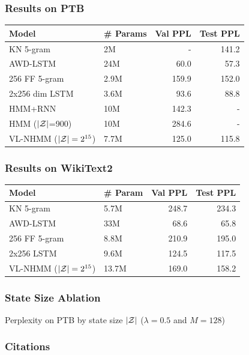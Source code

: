 \documentclass{beamer}
\begin{document}
\begin{frame}
\frametitle{Results on PTB}

\begin{table}[!t]
\centering
\begin{tabular}{llrr}
\toprule
Model & \# Params & Val PPL  & Test PPL\\
\midrule
KN 5-gram   & 2M & - & 141.2\\
AWD-LSTM  & 24M & 60.0 & 57.3\\
256 FF 5-gram  & 2.9M     & 159.9      & 152.0  \\
2x256 dim LSTM  & 3.6M     & 93.6       & 88.8   \\
HMM+RNN   & 10M & 142.3 & -\\
HMM ($|\mathcal{Z}|$=900) & 10M & 284.6 & -\\
VL-NHMM ($|\mathcal{Z}|=2^{15}$)   & 7.7M     & 125.0      & 115.8  \\
\bottomrule
\end{tabular}
\end{table}

\end{frame}

\begin{frame}
\frametitle{Results on WikiText2}

\begin{table}[!t]
\centering
\begin{tabular}{llrr}
\toprule
Model & \# Param & Val PPL & Test PPL\\
\midrule
KN 5-gram & 5.7M       & 248.7 & 234.3\\
AWD-LSTM & 33M & 68.6 & 65.8\\
256 FF 5-gram        & 8.8M    & 210.9  & 195.0\\
2x256  LSTM     & 9.6M    & 124.5  & 117.5\\
VL-NHMM ($|\mathcal{Z}|=2^{15}$)           & 13.7M   & 169.0      & 158.2\\
\bottomrule
\end{tabular}
\end{table}

\end{frame}

\begin{frame}
\frametitle{State Size Ablation}

\centering
{}

Perplexity on PTB by state size $|\mathcal{Z}|$ ($\lambda =0.5$ and $M=128$)
\end{frame}

\begin{frame}
\frametitle{Citations}


\end{frame}
\end{document}
